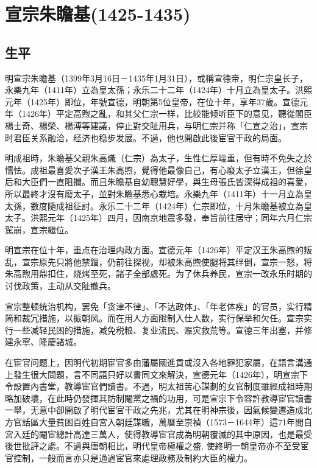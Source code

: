 
\section{宣宗朱瞻基\tiny(1425-1435)}

\subsection{生平}

明宣宗朱瞻基（1399年3月16日－1435年1月31日），或稱宣德帝，明仁宗皇长子，永樂九年（1411年）立為皇太孫；永乐二十二年（1424年）十月立為皇太子。洪熙元年（1425年）即位，年號宣德，明朝第5位皇帝，在位十年，享年37歲。宣德元年（1426年）平定高煦之亂，和其父仁宗一样，比较能倾听臣下的意见，聽從閣臣楊士奇、楊榮、楊溥等建議，停止對交阯用兵，与明仁宗并称「仁宣之治」，宣宗时君臣关系融洽，经济也稳步发展。不過，他也開啟此後宦官干政的局面。

明成祖時，朱瞻基父親朱高熾（仁宗）為太子，生性仁厚端重，但有時不免失之於懦怯。成祖最喜愛次子漢王朱高煦，覺得他最像自己，有心廢太子立漢王，但徐皇后和大臣們一直阻攔。而且朱瞻基自幼聰慧好學，與生母張氏皆深得成祖的喜愛，所以最終才沒有廢太子，並對朱瞻基悉心栽培。永樂九年（1411年）十一月立為皇太孫，數度隨成祖征討。永乐二十二年（1424年）仁宗即位，十月朱瞻基被立為皇太子。洪熙元年（1425年）四月，因南京地震多發，奉旨前往居守；同年六月仁宗駕崩，宣宗繼位。

明宣宗在位十年，重点在治理内政方面。宣德元年（1426年）平定汉王朱高煦的叛乱，宣宗原先只將他禁錮，仍前往探视，却被朱高煦使腿将其绊倒，宣宗一怒，将朱高煦用鼎扣住，烧烤至死，諸子全部處死。为了休兵养民，宣宗一改永乐时期的讨伐政策，主动从交阯撤兵。

宣宗整顿统治机构，罢免「贪津不律」、「不达政体」、「年老体疾」的官员，实行精简和裁冗措施，以振朝风。而在用人方面限制入仕人数，实行保举和欠任。宣宗实行一些减轻民困的措施，减免税粮、复业流民、赈灾救荒等。宣德三年出塞，并修建永寧、隆慶諸城。

在宦官问题上，因明代初期宦官多由藩屬國進貢或沒入各地罪犯家屬，在語言溝通上發生很大問題，言不同語只好以書同文來解決，宣德元年（1426年），明宣宗下令設置內書堂，教導宦官們讀書。不過，明太祖苦心謀劃的女官制度雖經成祖時期略加破壞，在此時仍發揮其防制閹黨之禍的功用，可是宣宗下令容許教導宦官讀書一舉，无意中卻開啟了明代宦官干政之先兆，尤其在明神宗後，因氣候變遷造成北方官話區大量貧困百姓自宮入朝廷謀職，萬曆至崇禎（1573－1644年）這71年間自宮入廷的閹宦總計高達三萬人，使得教導宦官成為明朝覆滅的其中原因，也是最受後世批評之處。不過與唐朝相比，明代皇帝極權之盛, 使終明一朝皇帝亦不至受宦官控制，一般而言亦只是通過宦官來處理政務及制約大臣的權力。

